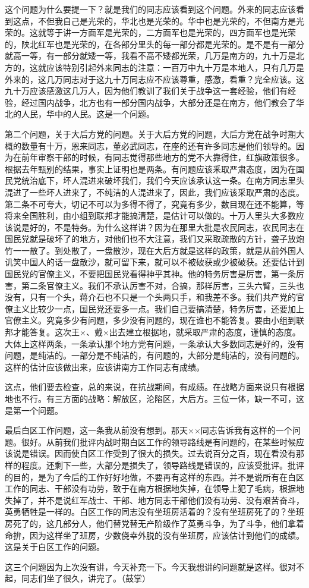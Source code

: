 这个问题为什么要提一下？就是我们的同志应该看到这个问题。外来的同志应该看到这点，不但我自己是光荣的，华北也是光荣的。华中也是光荣的，不但南方是光荣的。这就等于讲一方面军是光荣的，二方面军也是光荣的，四方面军也是光荣的，陕北红军也是光荣的，在各部分里头的每一部分都是光荣的。是不是有一部分就高一等，有一部分就矮一等，我看不高不矮都光荣，几万是南方的，九十万是北方的，这就应该特别引起外来同志的注意：一百万中九十万是本地人，只有几万是外来的，这几万同志对于这九十万同志应不应该尊重，感激，看重？完全应该。这九十万应该感激这几万人，因为他们教训了我们关于战争这一套经验，他们有经验，经过国内战争，北方也有一部分国内战争，大部分还是在南方，他们教会了华北的人民，华中的人民。这是一个问题。

第二个问题，关于大后方党的问题。关于大后方党的问题，大后方党在战争时期大概的数量有十万，恩来同志，董必武同志，在座的还有许多同志是他们领导的。因为在前年审察干部的时候，有同志觉得那些地方的党不大靠得住，红旗政策很多。根据去年甄别的结果，事实上证明也是两条。有问题应该釆取严肃态度，因为在国民党统治底下，坏人混进来破坏我们，我们今天应该承认这一条。在南方同志里头混进了一些坏人进来了，不纯洁的人混进来了，因此，我们应该采取严肃的态度。第二条不可夸大，切记不可以为多得不得了，究竟有多少，数目现在还不能算，等将来全国胜利，由小组到联邦才能搞清楚，是估计可以做的。十万人里头大多数应该说是好的，不是特务。为什么这样讲？因为在那里大批是农民同志，农民同志在国民党就是破坏了的地方，对他们也不大注意，我们又采取疏散的方针，聋子放炮竹一一散了。到处散了，一盘散沙，现在大后方就是这样的政策，就是从前外国人讥笑中国人的话一盘散沙，就可留下来，就可以不被破获或少被破获。还要估计到国民党的官僚主义，不要把国民党看得神乎其神。他的特务厉害是厉害，第一条厉害，第二条官僚主义。我们不承认厉害不对，合搞，那样厉害，三头六臂，三头也没有，只有一个头，蒋介石也不只是一个头两只手，和我差不多。我们共产党的官僚主义比较少一点，国民党还要多一点。我们自己要搞清楚，特务厉害，还要加上官僚主义。究竟多少有问题，多少没有问题的，现在谁也不能答复。要由小组到联邦才能答复。这次王×、戴×出去建立根据地，就采取严肃的态度，谨慎的态度。大体上这样两条，一条承认那个地方党有问题，一条承认大多数同志是好的，没有问题，是纯洁的。一部分是不纯洁的，有问题的，大部分是纯洁的，没有问题的。这样的估计应该做出来，应该讲南方工作同志有成绩。

这点，他们要去检查，总的来说，在抗战期间，有成绩。在战略方面来说只有根据地也不行。有三方面的战略：解放区，沦陷区，大后方。三位一体，缺一不可，这是第一个问题。

最后白区工作问题，这一条我从前没有想到。那天××同志告诉我有这样的一个问题。很好。从前我们批评内战时期白区工作的领导路线是有问题的，在某些时候应该说是错误。因而使白区工作受到了很大的损失。过去说百分之百，现在看没有那样的程度。还剩下一些，大部分是损失了，领导路线是错误的，应该受批评。批评的目的，是为了今后的工作好好地做，不要再有这样的东西。并不是说所有在白区工作的同志、干部没有功劳，致于在南方根据地失掉，在领导上犯了毛病，根据地失掉了，并不是说红军战士、干部、地方同志干部他们没有功劳、没有艰苦奋斗，英勇牺牲是一样的。白区工作的同志没有坐班房活着的？没有坐班房死了的？坐班房死了的，这几部分人，他们替党替无产阶级作了英勇斗争，为了斗争，他们拿着命拚，因为这样坐了班房，少数侥幸外脱的没有坐班房，应该估计到他们的成绩。这是关于白区工作的问题。

这三个问题因为上次没有讲，今天补充一下。今天我想讲的问题就是这样。很对不起，同志们坐了很久，讲完了。（鼓掌）

